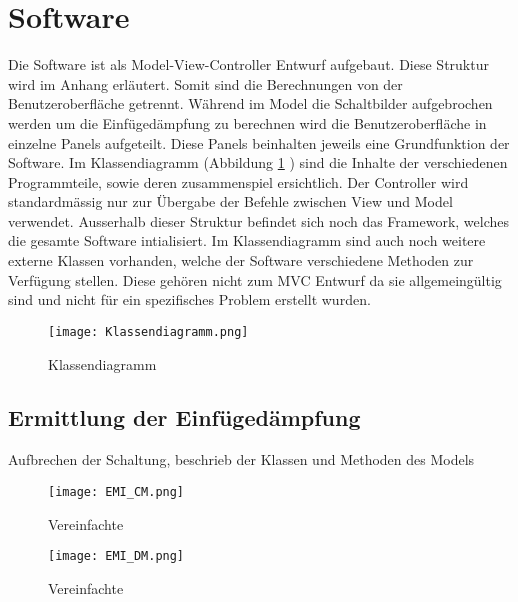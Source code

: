 \section{Software} \label{sec:software}

Die Software ist als Model-View-Controller Entwurf aufgebaut. Diese Struktur wird im Anhang erläutert. Somit sind die Berechnungen von der Benutzeroberfläche getrennt. Während im Model die Schaltbilder aufgebrochen werden um die Einfügedämpfung zu berechnen wird die Benutzeroberfläche in einzelne Panels aufgeteilt. Diese Panels beinhalten jeweils eine Grundfunktion der Software. Im Klassendiagramm (Abbildung \ref{fig:klassendiagramm} ) sind die Inhalte der verschiedenen Programmteile, sowie deren zusammenspiel ersichtlich. Der Controller wird standardmässig nur zur Übergabe der Befehle zwischen View und Model verwendet. Ausserhalb dieser Struktur befindet sich noch das Framework, welches die gesamte Software intialisiert. Im Klassendiagramm sind auch noch weitere externe Klassen vorhanden, welche der Software verschiedene Methoden zur Verfügung stellen. Diese gehören nicht zum MVC Entwurf da sie allgemeingültig sind und nicht für ein spezifisches Problem erstellt wurden.


\begin{figure}[H]
		\centering
		\texttt{[image: Klassendiagramm.png]}
		\label{fig:klassendiagramm}
		\caption{Klassendiagramm}
\end{figure}

\subsection{Ermittlung der Einfügedämpfung} \label{subsec:ermittlung}
Aufbrechen der Schaltung, beschrieb der Klassen und Methoden des Models

\begin{figure}[H]
	\begin{minipage}[h]{0.45\linewidth}
		\centering
		\texttt{[image: EMI\_CM.png]}
		\label{fig:piImpedance}
		\caption{Vereinfachte \cite{CM_Schaltung}}
	\end{minipage}
\end{figure}

\begin{figure}[H]
	\begin{minipage}[h]{0.45\linewidth}
		\centering
		\texttt{[image: EMI\_DM.png]}
		\label{fig:piImpedance}
		\caption{Vereinfachte \cite{DM-Schaltung}}
	\end{minipage}
\end{figure}


